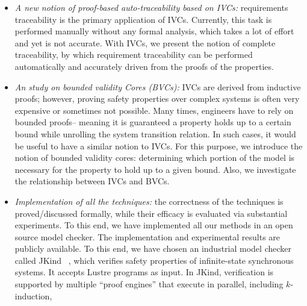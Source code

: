 \begin{itemize}
\item \emph{A new notion of proof-based auto-traceability based on IVCs:} requirements traceability is the primary application of IVCs. Currently, this task is performed manually without any formal analysis, which takes a lot of effort and yet is not accurate. With IVCs, we present the notion of complete traceability, by which requirement traceability can be performed automatically and accurately driven from the proofs of the properties.
     \item \emph{An study on bounded validity Cores (BVCs):} IVCs are derived from inductive proofs; however, proving safety properties over complex systems is often very expensive or sometimes not possible. Many times, engineers have to rely on bounded proofs-- meaning it is guaranteed a property holds up to a certain bound while unrolling the system transition relation. In such cases, it would be useful to have a similar notion to IVCs. For this purpose, we introduce the notion of bounded validity cores: determining which portion of the model is necessary for the property to hold up to a given bound. Also, we investigate the relationship between IVCs and BVCs.
\item \emph{Implementation of all the techniques:} the correctness of the techniques is proved/discussed formally, while their efficacy is evaluated via substantial experiments. To this end, we have implemented all our methods in an open source model checker. The implementation and experimental results are publicly available. To this  end, we have chosen an industrial model checker called JKind ~\cite{jkind},
which verifies safety properties of infinite-state synchronous systems.
It accepts Lustre programs \cite{Halbwachs91:lustre} as input. In JKind, verification is supported by multiple ``proof engines'' that execute in parallel, including $k$-induction,

\end{itemize}
